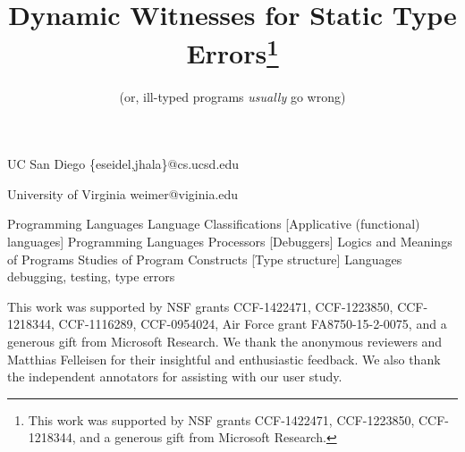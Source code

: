 \documentclass[9pt,numbers]{sigplanconf}
\theoremstyle{plain}%
\theoremstyle{definition}
\newcommand{\isTechReport}{false} %
\newcommand\includeTechReport[1]{%
  \ifthenelse{\equal{\isTechReport}{true}}
    {{#1}}
    {\ignorespaces}
\xspace}
\begin{document}
\toappear{}

\title{Dynamic Witnesses for Static Type Errors\thanks{This work was supported by NSF grants CCF-1422471, CCF-1223850,
CCF-1218344, and a generous gift from Microsoft Research.}}

\subtitle{(or, ill-typed programs \emph{usually} go wrong)}

           {UC San Diego}
           {\{eseidel,jhala\}@cs.ucsd.edu}

           {University of Virginia}
           {weimer@viginia.edu}

\maketitle





         {Programming Languages}
         {Language Classifications}
         [Applicative (functional) languages]
         {Programming Languages}
         {Processors}
         [Debuggers]
         {Logics and Meanings of Programs}
         {Studies of Program Constructs}
         [Type structure]
\terms
Languages
\keywords
debugging, testing, type errors






% 
% 

% 

\acks
%
This work was supported by
NSF grants CCF-1422471, CCF-1223850, CCF-1218344, CCF-1116289, CCF-0954024,
Air Force grant FA8750-15-2-0075,
and a generous gift from Microsoft Research.
%
We thank the anonymous reviewers and Matthias Felleisen for their
insightful and enthusiastic feedback.
%
We also thank the independent annotators for assisting with our user
study.

{


\balance
}

\includeTechReport
{

\clearpage
\appendix

%
}
\end{document}
